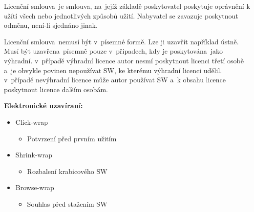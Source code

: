 Licenční smlouva~je smlouva, na~jejíž základě poskytovatel poskytuje oprávnění k užítí všech nebo jednotlivých způsobů užití. Nabyvatel se zavazuje poskytnout odměnu, není-li sjednáno jinak. 

Licenční smlouva~nemusí být v~písemné formě. Lze ji uzavřít například ústně. Musí být uzavřena~písemně pouze v~případech, kdy je poskytována~jako výhradní. v~případě výhradní licence autor nesmí poskytnout licenci třetí osobě a~je obvykle povinen nepoužívat SW, ke kterému výhradní licenci udělil. v~případě nevýhradní licence může autor používat SW a~k obsahu licence poskytnout licence dalším osobám. 
\newline

\noindent\textbf{Elektronické uzavíraní:}
\begin{itemize}[noitemsep]
    \item Click-wrap
    \begin{itemize}[noitemsep]
        \item Potvrzení před prvním užitím
    \end{itemize}
    \item Shrink-wrap
    \begin{itemize}[noitemsep]
        \item Rozbalení krabicového SW
    \end{itemize}
    \item Browse-wrap
    \begin{itemize}[noitemsep]
        \item Souhlas před stažením SW
    \end{itemize}
\end{itemize}

